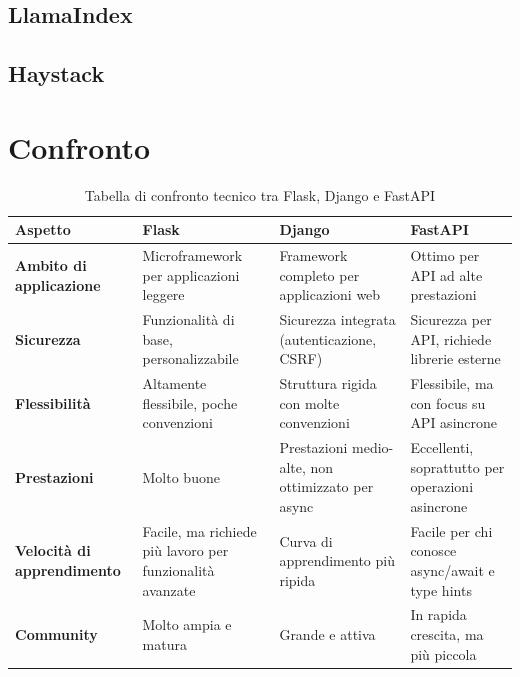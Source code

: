 \documentclass{article}
\begin{document}
\subsection{LlamaIndex}

\subsection{Haystack}



\section{Confronto}

\begin{table}[H]
    \renewcommand{\arraystretch}{1.7}
    \centering
    \begin{tabular}{|p{2.55cm}|p{4cm}|p{4cm}|p{4cm}|}
        \hline
        \textbf{Aspetto} & \textbf{\large Flask} & \textbf{\large Django} & \textbf{\large FastAPI} \\
        \hline
        \textbf{Ambito di applicazione} & Microframework per applicazioni leggere & Framework completo per applicazioni web & Ottimo per API ad alte prestazioni \\
        \hline
        \textbf{Sicurezza} & Funzionalità di base, personalizzabile & Sicurezza integrata (autenticazione, CSRF) & Sicurezza per API, richiede librerie esterne \\
        \hline
        \textbf{Flessibilità} & Altamente flessibile, poche convenzioni & Struttura rigida con molte convenzioni & Flessibile, ma con focus su API asincrone \\
        \hline
        \textbf{Prestazioni} & Molto buone & Prestazioni medio-alte, non ottimizzato per async & Eccellenti, soprattutto per operazioni asincrone \\
        \hline
        \textbf{Velocità di apprendimento} & Facile, ma richiede più lavoro per funzionalità avanzate & Curva di apprendimento più ripida & Facile per chi conosce async/await e type hints \\
        \hline
        \textbf{Community} & Molto ampia e matura & Grande e attiva & In rapida crescita, ma più piccola \\
        \hline
    \end{tabular}
    \caption{Tabella di confronto tecnico tra Flask, Django e FastAPI}
\end{table}
\end{document}
